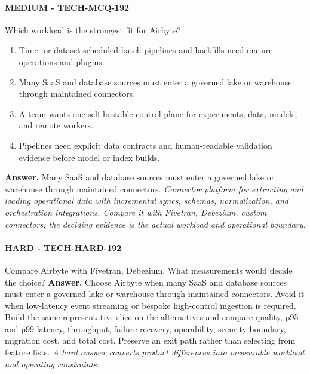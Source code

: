 \paragraph{MEDIUM - TECH-MCQ-192} Which workload is the strongest fit for Airbyte?
\begin{enumerate}[label=\Alph*.]
\item Time- or dataset-scheduled batch pipelines and backfills need mature operations and plugins.
\item Many SaaS and database sources must enter a governed lake or warehouse through maintained connectors.
\item A team wants one self-hostable control plane for experiments, data, models, and remote workers.
\item Pipelines need explicit data contracts and human-readable validation evidence before model or index builds.
\end{enumerate}
\textbf{Answer.} Many SaaS and database sources must enter a governed lake or warehouse through maintained connectors.
\textit{Connector platform for extracting and loading operational data with incremental syncs, schemas, normalization, and orchestration integrations. Compare it with Fivetran, Debezium, custom connectors; the deciding evidence is the actual workload and operational boundary.}
\paragraph{HARD - TECH-HARD-192} Compare Airbyte with Fivetran, Debezium. What measurements would decide the choice?
\textbf{Answer.} Choose Airbyte when many SaaS and database sources must enter a governed lake or warehouse through maintained connectors. Avoid it when low-latency event streaming or bespoke high-control ingestion is required. Build the same representative slice on the alternatives and compare quality, p95 and p99 latency, throughput, failure recovery, operability, security boundary, migration cost, and total cost. Preserve an exit path rather than selecting from feature lists.
\textit{A hard answer converts product differences into measurable workload and operating constraints.}
